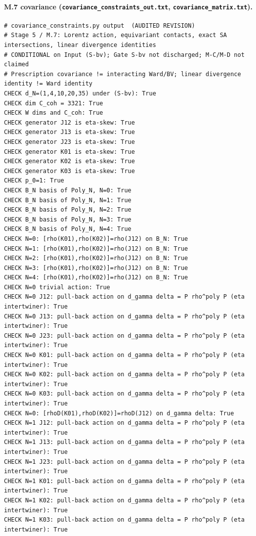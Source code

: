 \documentclass{article}
\theoremstyle{remark}
\begin{document}
\paragraph{M.7 covariance (\texttt{covariance\_constraints\_out.txt}, \texttt{covariance\_matrix.txt}).}
\begin{lstlisting}
# covariance_constraints.py output  (AUDITED REVISION)
# Stage 5 / M.7: Lorentz action, equivariant contacts, exact SA intersections, linear divergence identities
# CONDITIONAL on Input (S-bv); Gate S-bv not discharged; M-C/M-D not claimed
# Prescription covariance != interacting Ward/BV; linear divergence identity != Ward identity
CHECK d_N=(1,4,10,20,35) under (S-bv): True
CHECK dim C_coh = 3321: True
CHECK W dims and C_coh: True
CHECK generator J12 is eta-skew: True
CHECK generator J13 is eta-skew: True
CHECK generator J23 is eta-skew: True
CHECK generator K01 is eta-skew: True
CHECK generator K02 is eta-skew: True
CHECK generator K03 is eta-skew: True
CHECK p_0=1: True
CHECK B_N basis of Poly_N, N=0: True
CHECK B_N basis of Poly_N, N=1: True
CHECK B_N basis of Poly_N, N=2: True
CHECK B_N basis of Poly_N, N=3: True
CHECK B_N basis of Poly_N, N=4: True
CHECK N=0: [rho(K01),rho(K02)]=rho(J12) on B_N: True
CHECK N=1: [rho(K01),rho(K02)]=rho(J12) on B_N: True
CHECK N=2: [rho(K01),rho(K02)]=rho(J12) on B_N: True
CHECK N=3: [rho(K01),rho(K02)]=rho(J12) on B_N: True
CHECK N=4: [rho(K01),rho(K02)]=rho(J12) on B_N: True
CHECK N=0 trivial action: True
CHECK N=0 J12: pull-back action on d_gamma delta = P rho^poly P (eta intertwiner): True
CHECK N=0 J13: pull-back action on d_gamma delta = P rho^poly P (eta intertwiner): True
CHECK N=0 J23: pull-back action on d_gamma delta = P rho^poly P (eta intertwiner): True
CHECK N=0 K01: pull-back action on d_gamma delta = P rho^poly P (eta intertwiner): True
CHECK N=0 K02: pull-back action on d_gamma delta = P rho^poly P (eta intertwiner): True
CHECK N=0 K03: pull-back action on d_gamma delta = P rho^poly P (eta intertwiner): True
CHECK N=0: [rhoD(K01),rhoD(K02)]=rhoD(J12) on d_gamma delta: True
CHECK N=1 J12: pull-back action on d_gamma delta = P rho^poly P (eta intertwiner): True
CHECK N=1 J13: pull-back action on d_gamma delta = P rho^poly P (eta intertwiner): True
CHECK N=1 J23: pull-back action on d_gamma delta = P rho^poly P (eta intertwiner): True
CHECK N=1 K01: pull-back action on d_gamma delta = P rho^poly P (eta intertwiner): True
CHECK N=1 K02: pull-back action on d_gamma delta = P rho^poly P (eta intertwiner): True
CHECK N=1 K03: pull-back action on d_gamma delta = P rho^poly P (eta intertwiner): True

\end{lstlisting}
\end{document}
